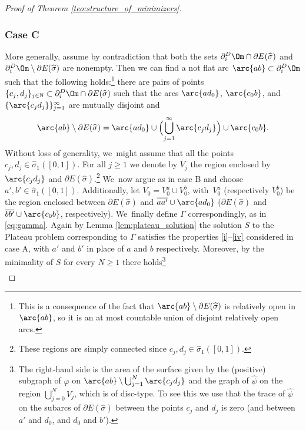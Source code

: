\begin{proof}[Proof of Theorem \ref{teo:structure_of_minimizers}]
\subsubsection*{Case C} More generally, assume by contradiction that both the sets $\partial_i^D\Om\cap\partial E(\widehat\sigma)$ and $\partial_i^D\Om\setminus\partial E(\widehat\sigma)$ are nonempty.
Then we can find a not flat arc $\arc{ab}\subset\partial_i^D\Om$ such that the following holds:\footnote{This is a consequence of the fact that $\arc{ab}\setminus\partial E(\widehat\sigma)$ is relatively open in $\arc{ab}$, so it is an at most countable union of disjoint relatively open arcs.} there are pairs of points $\{c_j,d_j\}_{j\in \mathbb N}\subset\partial_i^D\Om\cap\partial E(\widehat\sigma)$ such that the arcs $\arc{ad_0}$, $\arc{c_0b}$, and $\{\arc{c_jd_j}\}_{j=1}^\infty$ are mutually disjoint and
\begin{equation*}
\arc{ab}\setminus\partial E(\widehat\sigma)=\arc{ad_0}\cup\Bigl(\bigcup_{j=1}^\infty\arc{c_jd_j}\Bigr)\cup\arc{c_0b}.
\end{equation*}
Without loss of generality, we~might assume that all the points $c_j,d_j\in\widehat\sigma_1([0,1])$.
For all $j\ge1$ we denote by $V_j$ the region enclosed by $\arc{c_jd_j}$ and $\partial E(\widehat\sigma)$.\footnote{These regions are simply connected since $c_j,d_j\in\widehat\sigma_1([0,1])$.} We~now argue as in case B and choose $a',b'\in \widehat\sigma_1([0,1])$. Additionally, let $V_0=V_0^a\cup V_0^b$, with~$V_0^a$ (respectively $V_0^b$) be the region enclosed between $\partial E(\widehat\sigma)$ and $\overline{aa'}\cup\arc{ad_0}$ ($\partial E(\widehat\sigma)$ and $\overline{bb'}\cup\arc{c_0b}$, respectively). We~finally define $\Gamma$ correspondingly, as in \eqref{eq:gamma}.
Again by Lemma \ref{lem:plateau_solution} the solution $S$ to the Plateau problem corresponding to $\Gamma$ satisfies the properties \ref{i}--\ref{iv} considered in case A, with $a'$ and $b'$ in place of $a$ and $b$ respectively.
Moreover, by the minimality of $S$ for every $N\ge1$ there holds\footnote{The right-hand side is the area of the surface given by the (positive) subgraph of $\varphi$ on $\arc{ab}\setminus
\bigcup_{j=1}^N\arc{c_jd_j}$ and the graph of $\widehat\psi$ on the region $\bigcup_{j=0}^NV_j$, which is of disc-type.
To see this we use that the trace of $\widehat\psi$ on the
subarcs of $\partial E(\widehat\sigma)$ between the points $c_j$ and $d_j$
is zero (and between $a'$ and $d_0$, and $d_0$ and $b'$).}
\begin{multline}\label{eq:contradiction_bis}

\end{multline}
\end{proof}
